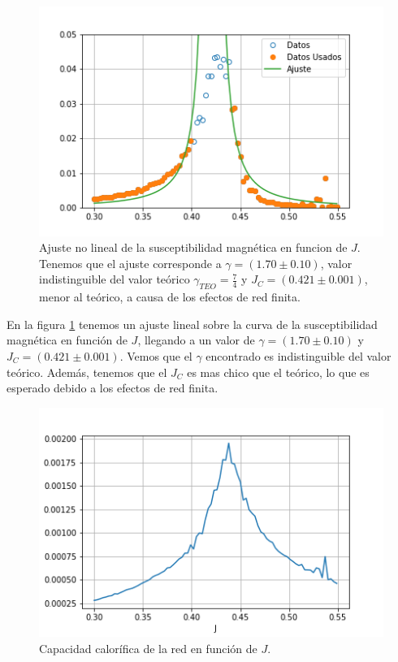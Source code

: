 \documentclass[%
 reprint,
 amsmath,amssymb,
 aps,
]{revtex4-1}
\begin{document}
\begin{figure}
  \includegraphics[width=1.0\columnwidth]{images/ajuste_gamma.png}
  \caption{Ajuste no lineal de la susceptibilidad magn\'etica en funcion de $J$.
  Tenemos que el ajuste corresponde a $\gamma = (1.70 \pm 0.10)$, valor
  indistinguible del valor te\'orico $\gamma_{TEO} = \frac{7}{4}$ y $J_C =
  (0.421 \pm 0.001)$, menor al te\'orico, a causa de los efectos de red finita.}
  \label{ajuste_gamma}
\end{figure}

En la figura \ref{ajuste_gamma} tenemos un ajuste lineal sobre la curva de la
susceptibilidad magn\'etica en funci\'on de $J$, llegando a un valor de $\gamma
= (1.70 \pm 0.10)$ y $J_C = (0.421 \pm 0.001)$. Vemos que el $\gamma$ encontrado es indistinguible del valor te\'orico. Adem\'as, tenemos que el $J_C$ es mas
chico que el te\'orico, lo que es esperado debido a los efectos de red finita.

\begin{figure}
  \includegraphics[width=1.0\columnwidth]{images/c_vs_j.png}
  \caption{Capacidad calor\'ifica de la red en funci\'on de $J$.}
  \label{c_vs_j}
\end{figure}
\end{document}
